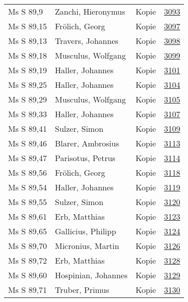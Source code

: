 \documentclass[10pt,a4paper,landscape]{report}
\begin{document}
\begin{longtable}{p{16cm}p{4cm}lr}
Ms S 89,9	&	Zanchi, Hieronymus	&	Kopie	&	\href{http://130.60.24.72/assignment/3093}{3093}\\
Ms S 89,15	&	Frölich, Georg	&	Kopie	&	\href{http://130.60.24.72/assignment/3097}{3097}\\
Ms S 89,13	&	Travers, Johannes	&	Kopie	&	\href{http://130.60.24.72/assignment/3098}{3098}\\
Ms S 89,18	&	Musculus, Wolfgang	&	Kopie	&	\href{http://130.60.24.72/assignment/3099}{3099}\\
Ms S 89,19	&	Haller, Johannes	&	Kopie	&	\href{http://130.60.24.72/assignment/3101}{3101}\\
Ms S 89,25	&	Haller, Johannes	&	Kopie	&	\href{http://130.60.24.72/assignment/3104}{3104}\\
Ms S 89,29	&	Musculus, Wolfgang	&	Kopie	&	\href{http://130.60.24.72/assignment/3105}{3105}\\
Ms S 89,33	&	Haller, Johannes	&	Kopie	&	\href{http://130.60.24.72/assignment/3107}{3107}\\
Ms S 89,41	&	Sulzer, Simon	&	Kopie	&	\href{http://130.60.24.72/assignment/3109}{3109}\\
Ms S 89,46	&	Blarer, Ambrosius	&	Kopie	&	\href{http://130.60.24.72/assignment/3113}{3113}\\
Ms S 89,47	&	Parisotus, Petrus	&	Kopie	&	\href{http://130.60.24.72/assignment/3114}{3114}\\
Ms S 89,56	&	Frölich, Georg	&	Kopie	&	\href{http://130.60.24.72/assignment/3118}{3118}\\
Ms S 89,54	&	Haller, Johannes	&	Kopie	&	\href{http://130.60.24.72/assignment/3119}{3119}\\
Ms S 89,55	&	Sulzer, Simon	&	Kopie	&	\href{http://130.60.24.72/assignment/3120}{3120}\\
Ms S 89,61	&	Erb, Matthias	&	Kopie	&	\href{http://130.60.24.72/assignment/3123}{3123}\\
Ms S 89,65	&	Gallicius, Philipp	&	Kopie	&	\href{http://130.60.24.72/assignment/3124}{3124}\\
Ms S 89,70	&	Micronius, Martin	&	Kopie	&	\href{http://130.60.24.72/assignment/3126}{3126}\\
Ms S 89,72	&	Erb, Matthias	&	Kopie	&	\href{http://130.60.24.72/assignment/3128}{3128}\\
Ms S 89,60	&	Hospinian, Johannes	&	Kopie	&	\href{http://130.60.24.72/assignment/3129}{3129}\\
Ms S 89,71	&	Truber, Primus	&	Kopie	&	\href{http://130.60.24.72/assignment/3130}{3130}\\

\end{longtable}
\end{document}
